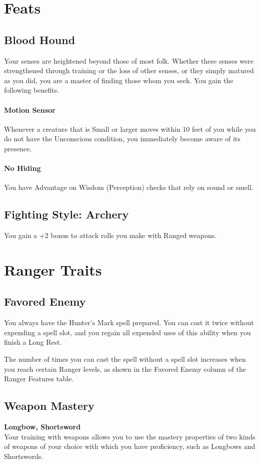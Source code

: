 \documentclass[letterpaper,openany,oneside,twocolumn]{book}
\begin{document}
\section*{Feats}
\subsection*{Blood Hound}
Your senses are heightened beyond those of most folk. Whether these senses were strengthened through training or the loss of other senses, or they simply matured as you did, you are a master of finding those whom you seek. You gain the following benefits.

\paragraph*{Motion Sensor} Whenever a creature that is Small or larger moves within 10 feet of you while you do not have the Unconscious condition, you immediately become aware of its presence.

\paragraph*{No Hiding} You have Advantage on Wisdom (Perception) checks that rely on sound or smell.
\subsection*{Fighting Style: Archery}
You gain a +2 bonus to attack rolls you make with Ranged weapons.

\section*{Ranger Traits}
\subsection*{Favored Enemy}
You always have the Hunter's Mark spell prepared. You can cast it twice without expending a spell slot, and you regain all expended uses of this ability when you finish a Long Rest.

The number of times you can cast the spell without a spell slot increases when you reach certain Ranger levels, as shown in the Favored Enemy column of the Ranger Features table.
\subsection*{Weapon Mastery}
\textbf{Longbow, Shortsword}\\
Your training with weapons allows you to use the mastery properties of two kinds of weapons of your choice with which you have proficiency, such as Longbows and Shortswords.
\end{document}
